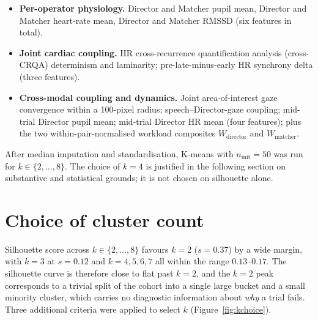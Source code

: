 \documentclass[BTech]{iitmdiss}
\begin{document}
\begin{itemize}
\item \textbf{Per-operator physiology.} Director and Matcher pupil mean, Director and Matcher heart-rate mean, Director and Matcher RMSSD (six features in total).
\item \textbf{Joint cardiac coupling.} HR cross-recurrence quantification analysis (cross-CRQA) determinism and laminarity; pre-late-minus-early HR synchrony delta (three features).
\item \textbf{Cross-modal coupling and dynamics.} Joint area-of-interest gaze convergence within a 100-pixel radius; speech--Director-gaze coupling; mid-trial Director pupil mean; mid-trial Director HR mean (four features); plus the two within-pair-normalised workload composites $W_{\text{director}}$ and $W_{\text{matcher}}$.
\end{itemize}

After median imputation and standardisation, K-means with $n_{\text{init}}=50$ was run for $k\in\{2,\dots,8\}$. The choice of $k=4$ is justified in the following section on substantive and statistical grounds; it is not chosen on silhouette alone.

\section{Choice of cluster count}
\label{app:kchoice}

Silhouette score across $k\in\{2,\dots,8\}$ favours $k=2$ ($s=0.37$) by a wide margin, with $k=3$ at $s=0.12$ and $k=4,5,6,7$ all within the range $0.13$--$0.17$. The silhouette curve is therefore close to flat past $k=2$, and the $k=2$ peak corresponds to a trivial split of the cohort into a single large bucket and a small minority cluster, which carries no diagnostic information about \emph{why} a trial fails. Three additional criteria were applied to select $k$ (Figure~\ref{fig:kchoice}).
\end{document}
